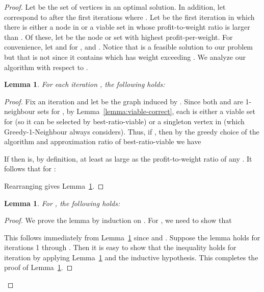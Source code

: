 \documentclass[12pt]{article}
\newtheorem{lemma}[theorem]{Lemma}
\begin{document}
\begin{proof}
Let  be the set of vertices in an optimal solution.  In addition, let  correspond to  after the first  iterations where .  Let  be the first iteration in which there is either a node in  or a viable set in  whose profit-to-weight ratio is larger than .  Of these, let  be the node or set with highest profit-per-weight.  For convenience, let   and  for , and .  Notice that  is a feasible solution to our problem but that  is not since it contains  which has weight exceeding .  We analyze our algorithm with respect to .

\begin{lemma} \label{lem:profit-inc-dag}
For each iteration , the following holds:

\end{lemma}









\begin{proof}
Fix an iteration  and let  be the graph induced by .  Since both  and  are 1-neighbour sets for , by Lemma~\ref{lemma:viable-correct}, each  is either a viable set for  (so it can be selected by {\sc best-ratio-viable}) or a singleton vertex in  (which {\sc Greedy-1-Neighbour} always considers).  Thus, if , then by the greedy choice of the algorithm and approximation ratio of {\sc best-ratio-viable} we have

If  then  is, by definition, at least as large as the profit-to-weight ratio of any .  It follows that for :

Rearranging gives Lemma~\ref{lem:profit-inc-dag}.
\hfill  \end{proof}

\begin{lemma} \label{lem:profit}
For , the following holds:

\end{lemma}

\begin{proof}
We prove the lemma by induction on .  For , we need to
show that

This follows immediately from Lemma~\ref{lem:profit-inc-dag} since  and . Suppose the lemma holds for iterations 1 through .  Then it is
easy to show that the inequality holds for iteration  by applying
Lemma~\ref{lem:profit-inc-dag} and the inductive hypothesis.  This
completes the proof of Lemma~\ref{lem:profit}.
\hfill
\end{proof}











\end{proof}
\end{document}
